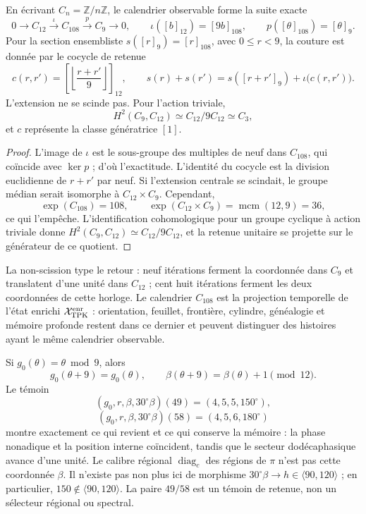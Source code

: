 \begin{proposition}
\label{prop:extension-central-108-no-escindida-rev8}
En écrivant \(C_n=\mathbb Z/n\mathbb Z\), le calendrier observable forme la
suite exacte
\[
 0\longrightarrow C_{12}
 \xrightarrow{\ \iota\ }C_{108}
 \xrightarrow{\ p\ }C_9
 \longrightarrow0,
 \qquad
 \iota([b]_{12})=[9b]_{108},\qquad
 p([\theta]_{108})=[\theta]_9.
\]
Pour la section ensembliste \(s([r]_9)=[r]_{108}\), avec
\(0\leq r<9\), la couture est donnée par le cocycle de retenue
\[
 c(r,r')=
 \left[\left\lfloor\frac{r+r'}{9}\right\rfloor\right]_{12},
 \qquad
 s(r)+s(r')=s([r+r']_9)+\iota\bigl(c(r,r')\bigr).
\]
L'extension ne se scinde pas. Pour l'action triviale,
\[
 H^2(C_9,C_{12})
 \simeq C_{12}/9C_{12}
 \simeq C_3,
\]
et \(c\) représente la classe génératrice \([1]\).
\end{proposition}

\begin{proof}
L'image de \(\iota\) est le sous-groupe des multiples de neuf dans
\(C_{108}\), qui coïncide avec \(\ker p\) ; d'où l'exactitude. L'identité
du cocycle est la division euclidienne de \(r+r'\) par neuf. Si l'extension
centrale se scindait, le groupe médian serait isomorphe à
\(C_{12}\times C_9\). Cependant,
\[
 \exp(C_{108})=108,\qquad
 \exp(C_{12}\times C_9)=\operatorname{mcm}(12,9)=36,
\]
ce qui l'empêche. L'identification cohomologique pour un groupe cyclique à
action triviale donne \(H^2(C_9,C_{12})\simeq C_{12}/9C_{12}\), et la retenue
unitaire se projette sur le générateur de ce quotient.
\end{proof}

La non-scission type le retour : neuf itérations ferment la coordonnée dans
\(C_9\) et translatent d'une unité dans \(C_{12}\) ; cent huit itérations ferment les deux
coordonnées de cette horloge. Le calendrier \(C_{108}\) est la projection
temporelle de l'état enrichi \(\mathcal X_{\rm TPK}^{\rm enr}\) :
orientation, feuillet, frontière, cylindre, généalogie et mémoire profonde
restent dans ce dernier et peuvent
distinguer des histoires ayant le même calendrier observable.

Si \(g_0(\theta)=\theta\bmod9\), alors
\[
 g_0(\theta+9)=g_0(\theta),\qquad
 \beta(\theta+9)=\beta(\theta)+1\pmod{12}.
\]
Le témoin
\[
 (g_0,r,\beta,30^\circ\beta)(49)=(4,5,5,150^\circ),
\]
\[
 (g_0,r,\beta,30^\circ\beta)(58)=(4,5,6,180^\circ)
\]
montre exactement ce qui revient et ce qui conserve la mémoire : la phase nonadique et
la position interne coïncident, tandis que le secteur dodécaphasique avance d'une unité.
Le calibre régional \(\operatorname{diag}_c\) des régions de \(\pi\) n'est
pas cette coordonnée \(\beta\). Il n'existe pas non plus ici de morphisme
\(30^\circ\beta\to h\in\langle90,120\rangle\) ; en particulier,
\(150\notin\langle90,120\rangle\). La paire \(49/58\) est un témoin de retenue,
non un sélecteur régional ou spectral.

